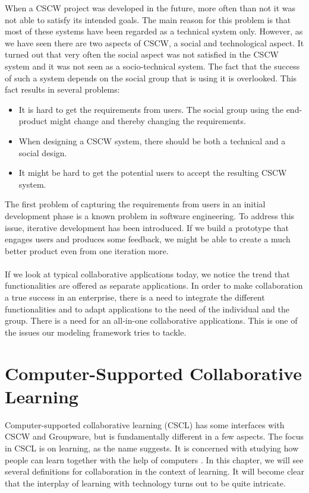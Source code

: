 When a CSCW project was developed in the future, more often than not it was not able to satisfy its intended goals. The main reason for this problem is that most of these systems have been regarded as a technical system only. However, as we have seen there are two aspects of CSCW, a social and technological aspect. It turned out that very often the social aspect was not satisfied in the CSCW system and it was not seen as a socio-technical system. The fact that the success of such a system depends on the social group that is using it is overlooked. This fact results in several problems:

\begin{itemize}
\item{It is hard to get the requirements from users. The social group using the end-product might change and thereby changing the requirements.}
\item{When designing a CSCW system, there should be both a technical and a social design.}
\item{It might be hard to get the potential users to accept the resulting CSCW system.}
\end{itemize}

The first problem of capturing the requirements from users in an initial development phase is a known problem in software engineering. To address this issue, iterative development has been introduced. If we build a prototype that engages users and produces some feedback, we might be able to create a much better product even from one iteration more.
\\ \\
If we look at typical collaborative applications today, we notice the trend that functionalities are offered as separate applications. In order to make collaboration a true success in an enterprise, there is a need to integrate the different functionalities and to adapt applications to the need of the individual and the group. There is a need for an all-in-one collaborative applications. This is one of the issues our modeling framework tries to tackle. 

\section{Computer-Supported Collaborative Learning}

Computer-supported collaborative learning (CSCL) has some interfaces with CSCW and Groupware, but is fundamentally different in a few aspects. The focus in CSCL is on learning, as the name suggests. It is concerned with studying how people can learn together with the help of computers \cite{CSCLHistory}. In this chapter, we will see several definitions for collaboration in the context of learning. It will become clear that the interplay of learning with technology turns out to be quite intricate. 

